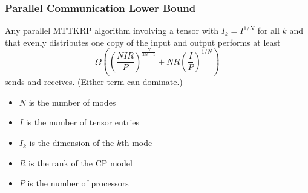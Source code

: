 \documentclass[xcolor=dvipsnames]{beamer}
\begin{document}
\begin{frame}
\frametitle{Parallel Communication Lower Bound}

\begin{theorem}
Any parallel MTTKRP algorithm involving a tensor with $I_k=I^{1/N}$ for all $k$ and that evenly distributes one copy of the input and output performs at least
\begin{equation*}
\Omega\left( \left( \frac{NIR}{P} \right)^{\frac{N}{2N-1}} + NR\left(\frac{I}{P}\right)^{1/N} \right)
\end{equation*}
sends and receives.  (Either term can dominate.)
\end{theorem}

\vfill

\small
\begin{itemize}
	\footnotesize
	\item $N$ is the number of modes
	\item $I$ is the number of tensor entries
	\item $I_k$ is the dimension of the $k$th mode
	\item $R$ is the rank of the CP model
	\item $P$ is the number of processors
\end{itemize}

\end{frame}
\end{document}
